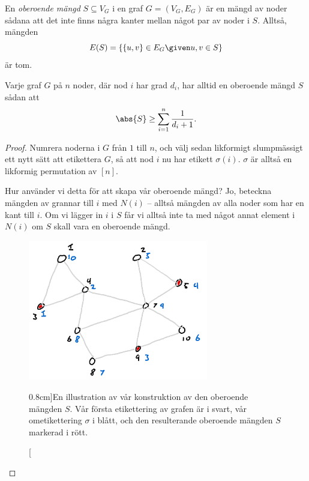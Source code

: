 \documentclass[nobib]{tufte-handout}
\begin{document}
\begin{definition}
    En \emph{oberoende mängd} $S \subseteq V_G$ i en graf $G = (V_G, E_G)$ är en mängd av noder sådana att det inte finns några kanter mellan något par av noder i $S$. Alltså, mängden
    $$E(S) = \left\{\{u,v\} \in E_G \given u, v \in S\right\}$$
    är tom.
\end{definition}

\begin{theorem}
    Varje graf $G$ på $n$ noder, där nod $i$ har grad $d_i$, har alltid en oberoende mängd $S$ sådan att
    $$\abs{S} \geq \sum_{i=1}^{n} \frac{1}{d_i + 1}.$$

    \begin{proof}
        Numrera noderna i $G$ från $1$ till $n$, och välj sedan likformigt slumpmässigt ett nytt sätt att etikettera $G$, så att nod $i$ nu har etikett $\sigma(i)$. $\sigma$ är alltså en likformig permutation av $[n]$.

        Hur använder vi detta för att skapa vår oberoende mängd? Jo, beteckna mängden av grannar till $i$ med $N(i)$ -- alltså mängden av alla noder som har en kant till $i$. Om vi lägger in $i$ i $S$ får vi alltså inte ta med något annat element i $N(i)$ om $S$ skall vara en oberoende mängd.
        
        \begin{figure}
            \centering
            \includegraphics[width = 0.7\textwidth]{graphics/Caro_Wei_construction.png}
            \caption[][0.8cm]{En illustration av vår konstruktion av den oberoende mängden $S$. Vår första etikettering av grafen är i svart, vår ometikettering $\sigma$ i blått, och den resulterande oberoende mängden $S$ markerad i rött.}
        \end{figure}


\end{proof}
\end{theorem}
\end{document}

